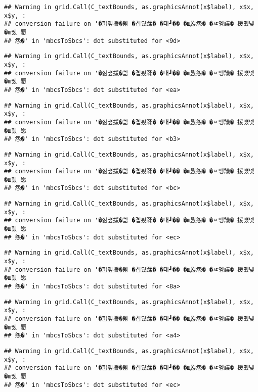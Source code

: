 \documentclass[
]{article}
\begin{document}
\begin{verbatim}
## Warning in grid.Call(C_textBounds, as.graphicsAnnot(x$label), x$x, x$y, :
## conversion failure on '�낆쟾援�쁾 �곕룄蹂� �대┛�� �щ쭩怨� �ㅼ엥議� 援먰넻�ш퀬 愿
## 怨�' in 'mbcsToSbcs': dot substituted for <9d>
\end{verbatim}

\begin{verbatim}
## Warning in grid.Call(C_textBounds, as.graphicsAnnot(x$label), x$x, x$y, :
## conversion failure on '�낆쟾援�쁾 �곕룄蹂� �대┛�� �щ쭩怨� �ㅼ엥議� 援먰넻�ш퀬 愿
## 怨�' in 'mbcsToSbcs': dot substituted for <ea>
\end{verbatim}

\begin{verbatim}
## Warning in grid.Call(C_textBounds, as.graphicsAnnot(x$label), x$x, x$y, :
## conversion failure on '�낆쟾援�쁾 �곕룄蹂� �대┛�� �щ쭩怨� �ㅼ엥議� 援먰넻�ш퀬 愿
## 怨�' in 'mbcsToSbcs': dot substituted for <b3>
\end{verbatim}

\begin{verbatim}
## Warning in grid.Call(C_textBounds, as.graphicsAnnot(x$label), x$x, x$y, :
## conversion failure on '�낆쟾援�쁾 �곕룄蹂� �대┛�� �щ쭩怨� �ㅼ엥議� 援먰넻�ш퀬 愿
## 怨�' in 'mbcsToSbcs': dot substituted for <bc>
\end{verbatim}

\begin{verbatim}
## Warning in grid.Call(C_textBounds, as.graphicsAnnot(x$label), x$x, x$y, :
## conversion failure on '�낆쟾援�쁾 �곕룄蹂� �대┛�� �щ쭩怨� �ㅼ엥議� 援먰넻�ш퀬 愿
## 怨�' in 'mbcsToSbcs': dot substituted for <ec>
\end{verbatim}

\begin{verbatim}
## Warning in grid.Call(C_textBounds, as.graphicsAnnot(x$label), x$x, x$y, :
## conversion failure on '�낆쟾援�쁾 �곕룄蹂� �대┛�� �щ쭩怨� �ㅼ엥議� 援먰넻�ш퀬 愿
## 怨�' in 'mbcsToSbcs': dot substituted for <8a>
\end{verbatim}

\begin{verbatim}
## Warning in grid.Call(C_textBounds, as.graphicsAnnot(x$label), x$x, x$y, :
## conversion failure on '�낆쟾援�쁾 �곕룄蹂� �대┛�� �щ쭩怨� �ㅼ엥議� 援먰넻�ш퀬 愿
## 怨�' in 'mbcsToSbcs': dot substituted for <a4>
\end{verbatim}

\begin{verbatim}
## Warning in grid.Call(C_textBounds, as.graphicsAnnot(x$label), x$x, x$y, :
## conversion failure on '�낆쟾援�쁾 �곕룄蹂� �대┛�� �щ쭩怨� �ㅼ엥議� 援먰넻�ш퀬 愿
## 怨�' in 'mbcsToSbcs': dot substituted for <ec>
\end{verbatim}
\end{document}
